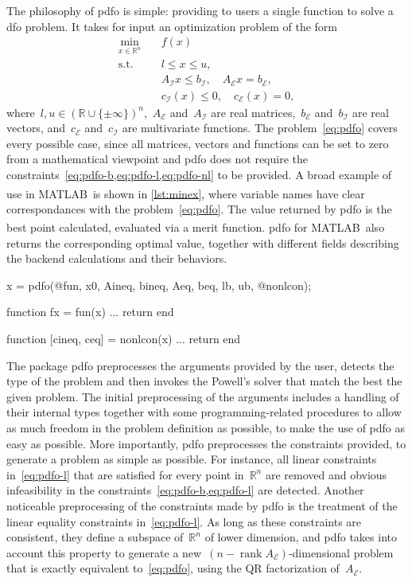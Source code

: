 \documentclass[11pt,draft]{article}
\numberwithin{equation}{section}
\DeclareMathOperator\rank{rank}
\def\R{\ensuremath{\mathbb{R}}}
\newcommand\set[2][]{#1\{#2#1\}}
\def\obj{\ensuremath{f}}
\def\bl{\ensuremath{l}}
\def\bu{\ensuremath{u}}
\newcommand\cgen[1][i]{c_{#1}}
\def\ceq{\ensuremath{\cgen[\scriptscriptstyle\mathcal{E}]}}
\def\cub{\ensuremath{\cgen[\scriptscriptstyle\mathcal{I}]}}
\def\aeq{\ensuremath{A_{\scriptscriptstyle\mathcal{E}}}}
\def\beq{\ensuremath{b_{\scriptscriptstyle\mathcal{E}}}}
\def\aub{\ensuremath{A_{\scriptscriptstyle\mathcal{I}}}}
\def\bub{\ensuremath{b_{\scriptscriptstyle\mathcal{I}}}}
\def\matlab{\mbox{MATLAB\textsuperscript{\textregistered}}}
\begin{document}
The philosophy of \gls{pdfo} is simple: providing to users a single function to solve a \gls{dfo} problem.
It takes for input an optimization problem of the form
\begin{subequations}
    \label{eq:pdfo}
    \begin{align}
        \min_{x \in \R^n}   & \quad \obj(x)\\
        \text{s.t.}         & \quad \bl \le x \le \bu, \label{eq:pdfo-b}\\
        & \quad \aub x \le \bub, \quad \aeq x = \beq, \label{eq:pdfo-l}\\
        & \quad \cub(x) \le 0, \quad \ceq(x) = 0, \label{eq:pdfo-nl}
    \end{align}
\end{subequations}
where~$\bl, \bu \in (\R \cup \set{\pm \infty})^n$,~$\aeq$ and~$\aub$ are real matrices,~$\beq$ and~$\bub$ are real vectors, and~$\ceq$ and~$\cub$ are multivariate functions.
The problem~\cref{eq:pdfo} covers every possible case, since all matrices, vectors and functions can be set to zero from a mathematical viewpoint and \gls{pdfo} does not require the constraints~\cref{eq:pdfo-b,eq:pdfo-l,eq:pdfo-nl} to be provided.
A broad example of use in \matlab\ is shown in \cref{lst:minex}, where variable names have clear correspondances with the problem~\cref{eq:pdfo}.
The value returned by \gls{pdfo} is the best point calculated, evaluated via a merit function.
\gls{pdfo} for \matlab\ also returns the corresponding optimal value, together with different fields describing the backend calculations and their behaviors.

\begin{matlablst}[%
    caption=An elementary example of PDFO in \matlab.,
    label=lst:minex
]
    x = pdfo(@fun, x0, Aineq, bineq, Aeq, beq, lb, ub, @nonlcon);

    function fx = fun(x)
    ...
    return
    end

    function [cineq, ceq] = nonlcon(x)
    ...
    return
    end
\end{matlablst}

The package \gls{pdfo} preprocesses the arguments provided by the user, detects the type of the problem and then invokes the Powell's solver that match the best the given problem.
The initial preprocessing of the arguments includes a handling of their internal types together with some programming-related procedures to allow as much freedom in the problem definition as possible, to make
the use of \gls{pdfo} as easy as possible.
More importantly, \gls{pdfo} preprocesses the constraints provided, to generate a problem as simple as possible.
For instance, all linear constraints in~\cref{eq:pdfo-l} that are satisfied for every point in~$\R^n$ are removed and obvious infeasibility in the constraints~\cref{eq:pdfo-b,eq:pdfo-l} are detected.
Another noticeable preprocessing of the constraints made by \gls{pdfo} is the treatment of the linear equality constraints in~\cref{eq:pdfo-l}.
As long as these constraints are consistent, they define a subspace of~$\R^n$ of lower dimension, and \gls{pdfo} takes into account this property to generate a new~$(n - \rank \aeq)$-dimensional problem that is exactly equivalent to~\cref{eq:pdfo}, using the QR factorization of~$\aeq$.
\end{document}
